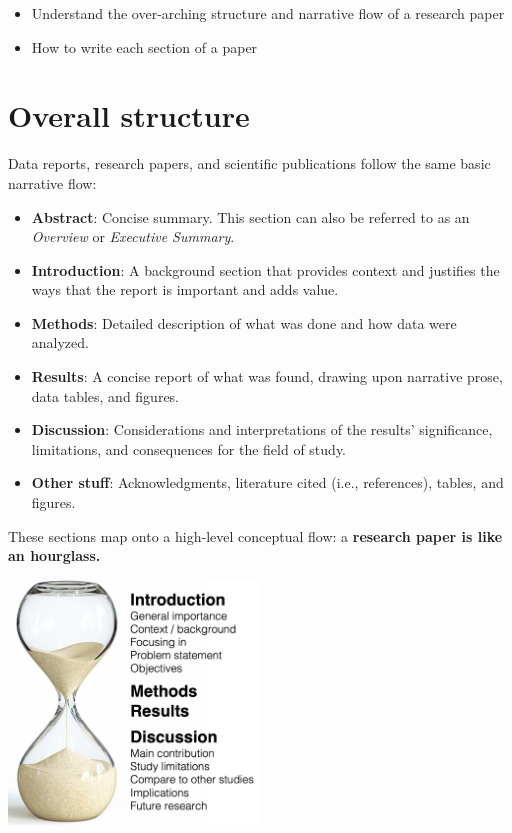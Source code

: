 \documentclass[
]{book}
\providecommand{\tightlist}{%
  \setlength{\itemsep}{0pt}\setlength{\parskip}{0pt}}
\begin{document}
\begin{itemize}
\tightlist
\item
  Understand the over-arching structure and narrative flow of a research paper\\
\item
  How to write each section of a paper
\end{itemize}

\hypertarget{overall-structure}{%
\section*{Overall structure}\label{overall-structure}}

Data reports, research papers, and scientific publications follow the same basic narrative flow:

\begin{itemize}
\tightlist
\item
  \textbf{Abstract}: Concise summary. This section can also be referred to as an \emph{Overview} or \emph{Executive Summary}.
\item
  \textbf{Introduction}: A background section that provides context and justifies the ways that the report is important and adds value.\\
\item
  \textbf{Methods}: Detailed description of what was done and how data were analyzed.\\
\item
  \textbf{Results}: A concise report of what was found, drawing upon narrative prose, data tables, and figures.
\item
  \textbf{Discussion}: Considerations and interpretations of the results' significance, limitations, and consequences for the field of study.
\item
  \textbf{Other stuff}: Acknowledgments, literature cited (i.e., references), tables, and figures.
\end{itemize}

These sections map onto a high-level conceptual flow: a \textbf{research paper is like an hourglass.}

\includegraphics[width=0.5\textwidth,height=\textheight]{img/hourglass.png}
\end{document}
